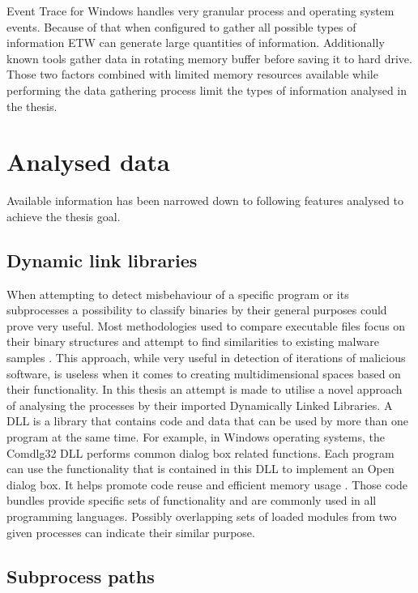 \documentclass[a4paper,twoside,12pt]{book}
\begin{document}
Event Trace for Windows handles very granular process and operating system events.
Because of that when configured to gather all possible types of information ETW can generate
large quantities of information. Additionally known tools gather data in rotating memory buffer 
before saving it to hard drive. Those two factors combined with limited memory resources 
available while performing the data gathering process limit the types of information analysed 
in the thesis. 



\section{Analysed data}
Available information has been narrowed down to following features analysed to achieve the thesis
goal.

\subsection{Dynamic link libraries}

When attempting to detect misbehaviour of a specific program or its subprocesses a possibility to 
classify binaries by their general purposes could prove very useful. Most methodologies used to 
compare executable files focus on their binary structures and attempt to find similarities to 
existing malware samples \cite{bib:malwclass}. This approach, while very useful in detection of 
iterations of malicious software, is useless when it comes to creating multidimensional spaces 
based on their functionality. In this thesis an attempt is made to utilise a novel approach of 
analysing the processes by their imported Dynamically Linked Libraries. A DLL is a library that 
contains code and data that can be used by more than one program at the same time. For example, 
in Windows operating systems, the Comdlg32 DLL performs common dialog box related functions. Each 
program can use the functionality that is contained in this DLL to implement an Open dialog box. 
It helps promote code reuse and efficient memory usage \cite{bib:dll}. Those code bundles provide 
specific sets of functionality and are commonly used in all programming languages. Possibly 
overlapping sets of loaded modules from two given processes can indicate their similar purpose. 

\subsection{Subprocess paths}
\end{document}
